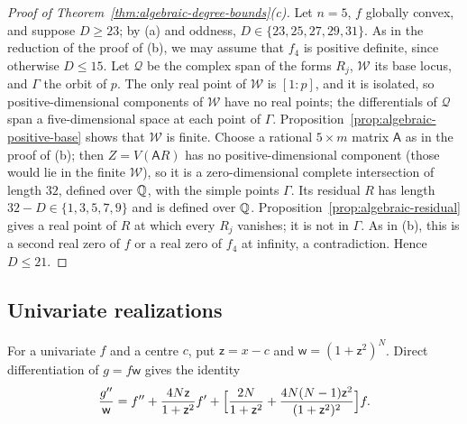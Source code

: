 \begin{proof}[Proof of Theorem~\ref{thm:algebraic-degree-bounds}(c)]
Let $n=5$, $f$ globally convex, and suppose $D\ge23$; by (a) and oddness,
$D\in\{23,25,27,29,31\}$. As in the reduction of the proof of (b), we may
assume that $f_4$ is positive definite, since otherwise $D\le15$. Let
$\mathcal Q$ be the complex span of the forms $R_j$, $\mathcal W$ its base
locus, and $\Gamma$ the orbit of $p$. The only real point of $\mathcal W$ is
$[1:p]$, and it is isolated, so positive-dimensional components of
$\mathcal W$ have no real points; the differentials of $\mathcal Q$ span a
five-dimensional space at each point of $\Gamma$.
Proposition~\ref{prop:algebraic-positive-base} shows that $\mathcal W$ is
finite. Choose a rational $5\times m$ matrix $\mathsf A$ as in the proof of
(b); then $Z=V(\mathsf AR)$ has no positive-dimensional component (those would
lie in the finite $\mathcal W$), so it is a zero-dimensional complete
intersection of length $32$, defined over $\mathbb Q$, with the simple points
$\Gamma$. Its residual $R$ has length $32-D\in\{1,3,5,7,9\}$ and is defined
over $\mathbb Q$. Proposition~\ref{prop:algebraic-residual} gives a real point of $R$
at which every $R_j$ vanishes; it is not in $\Gamma$. As in (b), this is a
second real zero of $f$ or a real zero of $f_4$ at infinity, a contradiction.
Hence $D\le21$.
\end{proof}

\subsection{Univariate realizations}
\label{app:algebraic-univariate}

For a univariate $f$ and a centre $c$, put $\mathsf z=x-c$ and
$\mathsf w=(1+\mathsf z^2)^N$. Direct differentiation of
$g=f\mathsf w$ gives the identity
\begin{equation}
 \frac{g''}{\mathsf w}=f''+\frac{4N\mathsf z}{1+\mathsf z^2}f'
 +\Bigl[\frac{2N}{1+\mathsf z^2}+\frac{4N(N-1)\mathsf z^2}{(1+\mathsf z^2)^2}
 \Bigr]f .
 \label{eq:algebraic-multiplier}
\end{equation}

